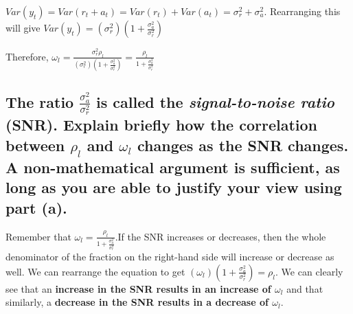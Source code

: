 \documentclass{article}
\begin{document}
\par\noindent\Large $Var(y_{t}) = Var(r_{t} + a_{t}) = Var(r_{t}) + Var(a_{t}) = \sigma_{r}^{2} + \sigma_{a}^{2}$.  Rearranging this will give $Var(y_{t}) = (\sigma_{r}^{2})(1 + \frac{\sigma_{a}^{2}}{\sigma_{r}^{2}})$\vspace{0.25cm}

\par\noindent\Large Therefore, \huge$\omega_{l} = \frac{\sigma_{r}^{2}\rho_{l}}{(\sigma_{r}^{2})(1 + \frac{\sigma_{a}^{2}}{\sigma_{r}^{2}})} = \frac{\rho_{l}}{1 + \frac{\sigma_{a}^{2}}{\sigma_{r}^{2}}}$

\subsection{The ratio $\frac{\sigma_{a}^{2}}{\sigma_{r}^{2}}$ is called the \textit{signal-to-noise ratio} (SNR).  Explain briefly how the correlation between $\rho_{l}$ and $\omega_{l}$ changes as the SNR changes.  A non-mathematical argument is sufficient, as long as you are able to justify your view using part (a).}

\par\noindent\Large Remember that \huge$\omega_{l} = \frac{\rho_{l}}{1 + \frac{\sigma_{a}^{2}}{\sigma_{r}^{2}}}$.\Large If the SNR increases or decreases, then the whole denominator of the fraction on the right-hand side will increase or decrease as well.  We can rearrange the equation to get $(\omega_{l})(1 + \frac{\sigma_{a}^{2}}{\sigma_{r}^{2}})= \rho_{l}$.  We can clearly see that an \textbf{increase in the SNR results in an increase of $\omega_{l}$} and that similarly, a \textbf{decrease in the SNR results in a decrease of $\omega_{l}$}.
\end{document}
